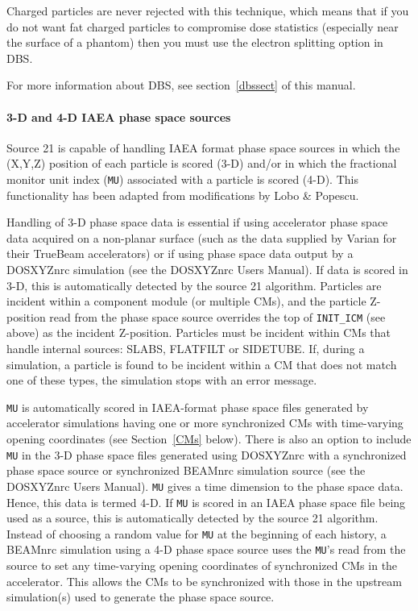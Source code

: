 \documentclass[12pt,twoside]{article}
\begin{document}
Charged particles are never
rejected with this technique, which means that if you do not want fat charged
particles to compromise dose statistics (especially near the surface of a
phantom) then you must use the electron splitting option in DBS.

For more information about DBS, see section~\ref{dbssect} of this manual.


\paragraph{3-D and 4-D IAEA phase space sources}
Source 21 is capable of handling IAEA format phase space sources in which the (X,Y,Z) position of
each particle is scored (3-D) and/or in which the fractional monitor unit index ({\tt MU}) associated with a
particle is scored (4-D).  This functionality has been adapted from modifications by Lobo \& Popescu\cite{LP10}.

Handling of 3-D phase space data is essential if using accelerator phase space data acquired on a non-planar
surface (such as the data supplied by Varian for their TrueBeam accelerators) or if using phase space
data output by a DOSXYZnrc simulation (see the DOSXYZnrc Users Manual\cite{Wa05}).  If data is scored
in 3-D, this is automatically detected by the source 21 algorithm.  Particles are incident within
a component module (or multiple CMs), and the particle Z-position read from the phase space source
overrides the top of {\tt INIT\_ICM} (see above) as the incident Z-position.  Particles must
be incident within CMs that handle internal sources: SLABS, FLATFILT or SIDETUBE.  If, during a simulation, a
particle is found to be incident within a CM that does not match one of these types, the simulation stops with
an error message.

{\tt MU} is automatically scored in IAEA-format phase space files generated by
accelerator simulations having one or more synchronized CMs with time-varying opening coordinates
(see Section~\ref{CMs} below).  There is also an option to include {\tt MU} in the 3-D phase space files
generated using DOSXYZnrc with a synchronized phase space source or synchronized BEAMnrc simulation
source (see the DOSXYZnrc Users Manual\cite{Wa05}).  {\tt MU} gives a time dimension to the
phase space data.  Hence, this data is termed 4-D.  If {\tt MU} is scored in an IAEA phase space file
being used as a
source, this is automatically detected by the source 21 algorithm.  Instead of choosing a random
value for {\tt MU} at the beginning of each history, a BEAMnrc simulation using a 4-D phase space source uses
the {\tt MU}'s read from the source to set any time-varying opening coordinates of synchronized CMs in the accelerator.
 This allows the CMs to be synchronized with those in the upstream simulation(s) used to generate
the phase space source.
\end{document}
